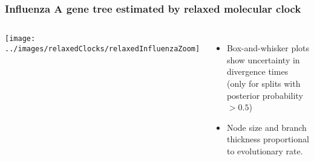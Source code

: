 \begin{frame}[plain]
\frametitle{Influenza A gene tree estimated by relaxed molecular clock}

\begin{columns}


\texttt{[image: ../images/relaxedClocks/relaxedInfluenzaZoom]}


\begin{itemize}
\item Box-and-whisker plots show uncertainty in divergence times (only for splits with posterior probability $> 0.5$)

\medskip{}

\item Node size and branch thickness proportional to evolutionary rate.
\end{itemize}


\end{columns}

\end{frame}